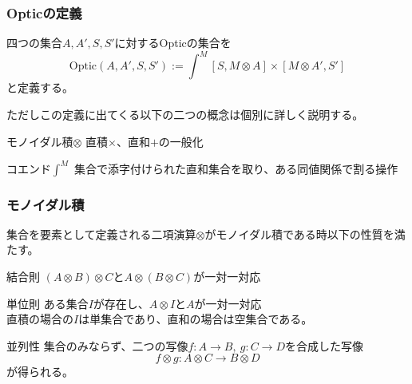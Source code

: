 \documentclass[uplatex,dvipdfmx]{beamer}
\newcommand{\arrow}{\rightarrow}
\newcommand{\mor}[3]{#1:#2\arrow #3}
\newcommand{\inset}[2]{[#1,#2]}
\newenvironment{mydescription}
{\begin{description}
  \setlength{\parskip}{0.5cm}
}
{\end{description}}
\begin{document}
  \begin{frame}\frametitle{Opticの定義}
    \begin{definition}[Optic]
      四つの集合$A,A',S,S'$に対するOpticの集合を\[\mathrm{Optic}(A,A',S,S') := \int^M \inset{S}{M\otimes A}\times \inset{M\otimes A'}{S'}\]と定義する。
    \end{definition}
    ただしこの定義に出てくる以下の二つの概念は個別に詳しく説明する。\\
    \vspace{\baselineskip}

    \begin{mydescription}
      \item[モノイダル積$\otimes$] 直積$\times$、直和$+$の一般化
      \item[コエンド$\int^M$] 集合で添字付けられた直和集合を取り、ある同値関係で割る操作
    \end{mydescription}
  \end{frame}
  \begin{frame}\frametitle{モノイダル積}
    集合を要素として定義される二項演算$\otimes$がモノイダル積である時以下の性質を満たす。\\
    \vspace{\baselineskip}

    \begin{mydescription}
      \item[結合則] $(A\otimes B)\otimes C$と$A\otimes(B\otimes C)$が一対一対応
      \item[単位則] ある集合$I$が存在し、$A\otimes I$と$A$が一対一対応\\
      直積の場合の$I$は単集合であり、直和の場合は空集合である。
      \item[並列性] 集合のみならず、二つの写像$\mor{f}{A}{B},\ \mor{g}{C}{D}$を合成した写像
      \[\mor{f\otimes g}{A\otimes C}{B\otimes D}\]が得られる。
    \end{mydescription}
  \end{frame}
\end{document}
